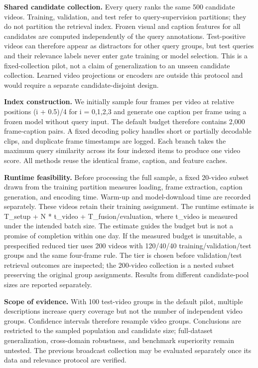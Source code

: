 \textbf{Shared candidate collection.} Every query ranks the same 500 candidate videos. Training, validation, and test refer to query-supervision partitions; they do not partition the retrieval index. Frozen visual and caption features for all candidates are computed independently of the query annotations. Test-positive videos can therefore appear as distractors for other query groups, but test queries and their relevance labels never enter gate training or model selection. This is a fixed-collection pilot, not a claim of generalization to an unseen candidate collection. Learned video projections or encoders are outside this protocol and would require a separate candidate-disjoint design.

\textbf{Index construction.} We initially sample four frames per video at relative positions (i + 0.5)/4 for i = 0,1,2,3 and generate one caption per frame using a frozen model without query input. The default budget therefore contains 2,000 frame-caption pairs. A fixed decoding policy handles short or partially decodable clips, and duplicate frame timestamps are logged. Each branch takes the maximum query similarity across its four indexed items to produce one video score. All methods reuse the identical frame, caption, and feature caches.

\textbf{Runtime feasibility.} Before processing the full sample, a fixed 20-video subset drawn from the training partition measures loading, frame extraction, caption generation, and encoding time. Warm-up and model-download time are recorded separately. These videos retain their training assignment. The runtime estimate is T\_setup + N * t\_video + T\_fusion/evaluation, where t\_video is measured under the intended batch size. The estimate guides the budget but is not a promise of completion within one day. If the measured budget is unsuitable, a prespecified reduced tier uses 200 videos with 120/40/40 training/validation/test groups and the same four-frame rule. The tier is chosen before validation/test retrieval outcomes are inspected; the 200-video collection is a nested subset preserving the original group assignments. Results from different candidate-pool sizes are reported separately.

\textbf{Scope of evidence.} With 100 test-video groups in the default pilot, multiple descriptions increase query coverage but not the number of independent video groups. Confidence intervals therefore resample video groups. Conclusions are restricted to the sampled population and candidate size; full-dataset generalization, cross-domain robustness, and benchmark superiority remain untested. The previous broadcast collection may be evaluated separately once its data and relevance protocol are verified.

